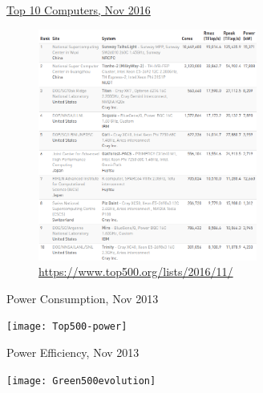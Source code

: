 \documentclass[xcolor=x11names,compress]{beamer}
\renewcommand{\(}{\begin{columns}}
\renewcommand{\)}{\end{columns}}
\newcommand{\<}[1]{\begin{column}{#1}}
\renewcommand{\>}{\end{column}}
\begin{document}
\begin{frame}{\href{https://www.top500.org/lists/2016/11/}{Top 10 Computers, Nov 2016}}

\begin{center}
\begin{figure}
\includegraphics[height=3in]{../figs/2016-top-10}
\caption{\url{https://www.top500.org/lists/2016/11/}}
\end{figure}
\end{center}

\end{frame}

\begin{frame}{Power Consumption, Nov 2013}

\begin{center}
\texttt{[image: Top500-power]}
\end{center}

\end{frame}

\begin{frame}{Power Efficiency, Nov 2013}

\begin{center}
\texttt{[image: Green500evolution]}
\end{center}

\end{frame}
\end{document}
